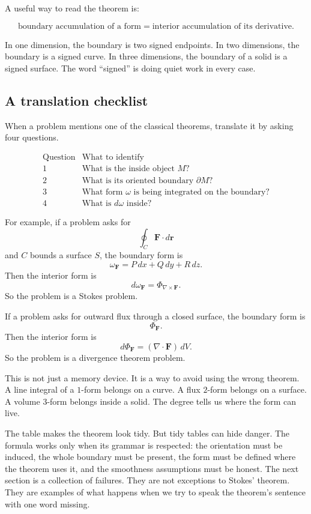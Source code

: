 A useful way to read the theorem is:

\[
\boxed{
    \text{boundary accumulation of a form}
    =
    \text{interior accumulation of its derivative}.
}
\]

In one dimension, the boundary is two signed endpoints.  In two dimensions, the
boundary is a signed curve.  In three dimensions, the boundary of a solid is a signed
surface.  The word ``signed'' is doing quiet work in every case.

\subsection{A translation checklist}

When a problem mentions one of the classical theorems, translate it by asking four
questions.

\[
\begin{array}{c|l}
\text{Question} & \text{What to identify} \\ \hline
1 & \text{What is the inside object }M?\\[1mm]
2 & \text{What is its oriented boundary }\partial M?\\[1mm]
3 & \text{What form }\omega\text{ is being integrated on the boundary?}\\[1mm]
4 & \text{What is }d\omega\text{ inside?}
\end{array}
\]

For example, if a problem asks for
\[
    \oint_C \mathbf F\cdot d\mathbf r
\]
and \(C\) bounds a surface \(S\), the boundary form is
\[
    \omega_{\mathbf F}=P\,dx+Q\,dy+R\,dz.
\]
Then the interior form is
\[
    d\omega_{\mathbf F}=\Phi_{\nabla\times\mathbf F}.
\]
So the problem is a Stokes problem.

If a problem asks for outward flux through a closed surface, the boundary form is
\[
    \Phi_{\mathbf F}.
\]
Then the interior form is
\[
    d\Phi_{\mathbf F}=(\nabla\cdot\mathbf F)\,dV.
\]
So the problem is a divergence theorem problem.

This is not just a memory device.  It is a way to avoid using the wrong theorem.  A
line integral of a \(1\)-form belongs on a curve.  A flux \(2\)-form belongs on a surface.
A volume \(3\)-form belongs inside a solid.  The degree tells us where the form can
live.

The table makes the theorem look tidy.  But tidy tables can hide danger.  The formula
works only when its grammar is respected: the orientation must be induced, the whole
boundary must be present, the form must be defined where the theorem uses it, and the
smoothness assumptions must be honest.  The next section is a collection of failures.
They are not exceptions to Stokes' theorem.  They are examples of what happens when
we try to speak the theorem's sentence with one word missing.


